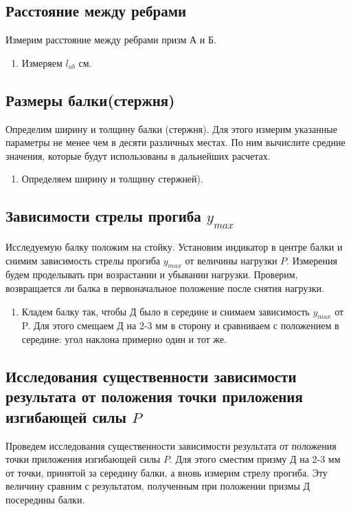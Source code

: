 \documentclass[a4paper, 12pt]{article}%
\begin{document}
\subsection{Расстояние между ребрами}

Измерим расстояние между ребрами призм А и Б.

\begin{enumerate}
\item Измеряем $l_{ab}$ см.
\end{enumerate}

\subsection{Размеры балки(стержня)}

Определим ширину и толщину балки (стержня). Для этого измерим указанные параметры не менее чем в десяти различных местах. По ним вычислите средние значения, которые будут использованы в дальнейших расчетах.

\begin{enumerate}
\item Определяем ширину и толщину стержней). 
\end{enumerate}

\subsection{Зависимости стрелы прогиба $y_{max}$}

Исследуемую балку положим на стойку. Установим индикатор в центре балки и снимим зависимость стрелы прогиба $y_{max}$ от величины нагрузки $P$. Измерения будем проделывать при возрастании и убывании нагрузки. Проверим, возвращается ли балка в первоначальное положение после снятия нагрузки.

\begin{enumerate}
\item Кладем балку так, чтобы Д было в середине и снимаем зависимость $y_{max}$ от P. Для этого смещаем Д на 2-3 мм в сторону и сравниваем с положением в середине: угол наклона примерно один и тот же.
\end{enumerate}

\subsection{Исследования существенности зависимости результата от положения точки приложения изгибающей силы $P$}


Проведем исследования существенности зависимости результата от положения точки приложения изгибающей силы $P$. Для этого сместим призму Д на 2-3 мм от точки, принятой за середину балки, а вновь измерим стрелу прогиба. Эту величину сравним с результатом, полученным при положении призмы Д посередины балки.
\end{document}
